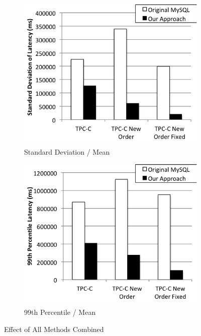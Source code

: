 \begin{figure}
    \begin{subfigure}[t]{0.24\textwidth}
        \includegraphics[width=\textwidth]{plots/all/std}
        \caption{Standard Deviation / Mean}
        \label{fig:all-std-mean}
    \end{subfigure}
    \begin{subfigure}[t]{0.24\textwidth}
        \includegraphics[width=\textwidth]{plots/all/99}
        \caption{99th Percentile / Mean}
        \label{fig:all-99-mean}
    \end{subfigure}
    \caption{Effect of All Methods Combined}
    \label{fig:all-combined}
\end{figure}

